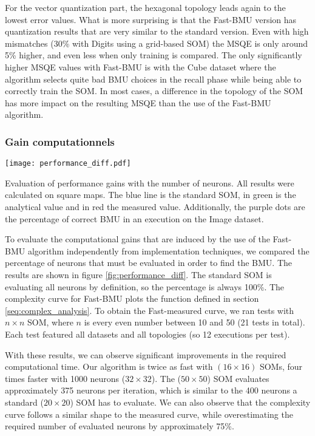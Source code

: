	For the vector quantization part, the hexagonal topology leads again to the lowest error values. What is more surprising is that the Fast-BMU version has quantization results that are very similar to the standard version. Even with high mismatches (30\% with Digits using a grid-based SOM) the MSQE is only around 5\% higher, and even less when only training is compared. The only significantly higher MSQE values with Fast-BMU is with the Cube dataset where the algorithm selects quite bad BMU choices in the recall phase while being able to correctly train the SOM. In most cases, a difference in the topology of the SOM has more impact on the resulting MSQE than the use of the Fast-BMU algorithm. 

	\subsubsection{Gain computationnels}\label{fast:seq:gain_comput}

	\begin{figureth}
    	\centering
    	\texttt{[image: performance\_diff.pdf]}
    	\caption{Evaluation of performance gains with the number of neurons. All results were calculated on square maps. The blue line is the standard SOM, in green is the analytical value and in red the measured value. Additionally, the purple dots are the percentage of correct BMU in an execution on the Image dataset.}
    	\label{fig:performance_diff}
	\end{figureth}


	To evaluate the computational gains that are induced by the use of the Fast-BMU algorithm independently from implementation techniques, we compared the percentage of neurons that must be evaluated in order to find the BMU. The results are shown in figure \ref{fig:performance_diff}. The standard SOM is evaluating all neurons by definition, so the percentage is always 100\%. The complexity curve for Fast-BMU plots the function defined in section \ref{seq:complex_analysis}. To obtain the Fast-measured curve, we ran tests with $n\times n$ SOM, where $n$ is every even number between 10 and 50 (21 tests in total). Each test featured all datasets and all topologies (so 12 executions per test). 

	With these results, we can observe significant improvements in the required computational time. Our algorithm is twice as fast with $(16\times16)$ SOMs, four times faster with 1000 neurons ($32\times32$). The ($50\times50$) SOM evaluates approximately 375 neurons per iteration, which is similar to the 400 neurons a standard ($20\times20$) SOM has to evaluate. We can also observe that the complexity curve follows a similar shape to the measured curve, while overestimating the required number of evaluated neurons by approximately 75\%.	

